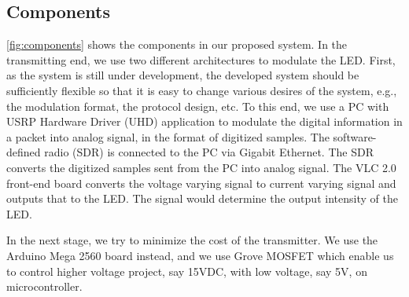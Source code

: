 \subsection{Components}



\autoref{fig:components} shows the components in our proposed system. 
In the transmitting end, we use two different architectures to modulate the LED.
First, as the system is still under development, the developed system should be sufficiently flexible so that it is easy to change various desires of the system, e.g., the modulation format, the protocol design, etc. To this end, we use a PC with USRP Hardware Driver (UHD) application to modulate the digital information in a packet into analog signal, in the format of digitized samples. 
The software-defined radio (SDR) is connected to the PC via Gigabit Ethernet. The SDR converts the digitized samples sent from the PC into analog signal. 
The VLC 2.0 front-end board converts the voltage varying signal to current varying signal and outputs that to the LED. The signal would determine the output intensity of the LED. 

In the next stage, we try to minimize the cost of the transmitter. We use the Arduino Mega 2560 board instead, and we use Grove MOSFET which enable us to control higher voltage project, say 15VDC, with low voltage, say 5V, on microcontroller. 

